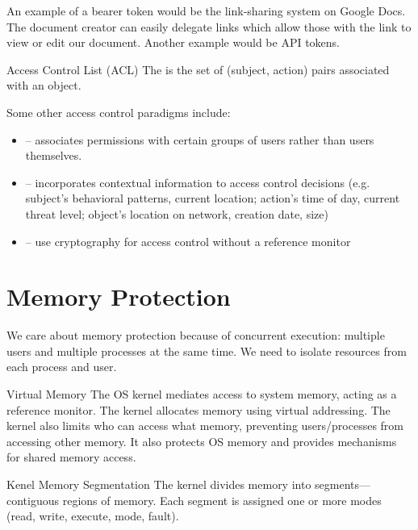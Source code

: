\documentclass[12pt]{report}
\begin{document}
An example of a bearer token would be the link-sharing system on Google Docs. The document creator can easily delegate links which allow those with the link to view or edit our document. Another example would be API tokens.

\begin{dfnbox}{Access Control List (ACL)}{}
    The  is the set of (subject, action) pairs associated with an object.
\end{dfnbox}

Some other access control paradigms include:
\begin{itemize}
    \item {} -- associates permissions with certain groups of users rather than users themselves.
    \item {} -- incorporates contextual information to access control decisions (e.g. subject's behavioral patterns, current location; action's time of day, current threat level; object's location on network, creation date, size)
    \item {} -- use cryptography for access control without a reference monitor
\end{itemize}

\section{Memory Protection}
We care about memory protection because of concurrent execution: multiple users and multiple processes at the same time. We need to isolate resources from each process and user.

\begin{dfnbox}{Virtual Memory}{}
The OS kernel mediates access to system memory, acting as a reference monitor. The kernel allocates memory using virtual addressing. The kernel also limits who can access what memory, preventing users/processes from accessing other memory. It also protects OS memory and provides mechanisms for shared memory access.
\end{dfnbox}

\begin{dfnbox}{Kenel Memory Segmentation}{}
    The kernel divides memory into segments---contiguous regions of memory. Each segment is assigned one or more modes (read, write, execute, mode, fault).
\end{dfnbox}
\end{document}
